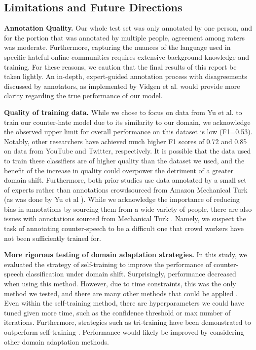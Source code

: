\documentclass[10pt,twocolumn,letterpaper]{article}
\begin{document}
\subsection*{Limitations and Future Directions}

\textbf{Annotation Quality.} Our whole test set was only annotated by one person, and for the portion that was annotated by multiple people, agreement among raters was moderate. Furthermore, capturing the nuances of the language used in specific hateful online communities requires extensive background knowledge and training. For these reasons, we caution that the final results of this report be taken lightly. An in-depth, expert-guided annotation process with disagreements discussed by annotators, as implemented by Vidgen et al. \cite{vidgen-etal-2021-introducing} would provide more clarity regarding the true performance of our model.

\textbf{Quality of training data.} While we chose to focus on data from Yu et al. \cite{yu-etal-2022-hate} to train our counter-hate model due to its similarity to our domain, we acknowledge the observed upper limit for overall performance on this dataset is low (F1=0.53). Notably, other researchers have achieved much higher F1 scores of 0.72 \cite{mathew2019thou} and 0.85 \cite{he2021racism} on data from YouTube and Twitter, respectively. It is possible that the data used to train these classifiers are of higher quality than the dataset we used, and the benefit of the increase in quality could overpower the detriment of a greater domain shift. Furthermore, both prior studies use data annotated by a small set of experts rather than annotations crowdsourced from Amazon Mechanical Turk (as was done by Yu et al \cite{yu-etal-2022-hate}). While we acknowledge the importance of reducing bias in annotations by sourcing them from a wide variety of people, there are also issues with annotations sourced from Mechanical Turk \cite{fort2011amazon}. Namely, we suspect the task of annotating counter-speech to be a difficult one that crowd workers have not been sufficiently trained for.

\textbf{More rigorous testing of domain adaptation strategies.} In this study, we evaluated the strategy of self-training to improve the performance of counter-speech classification under domain shift. Surprisingly, performance decreased when using this method. However, due to time constraints, this was the only method we tested, and there are many other methods that could be applied \cite{ramponi2020neural}. Even within the self-training method, there are hyperparameters we could have tuned given more time, such as the confidence threshold or max number of iterations. Furthermore, strategies such as tri-training have been demonstrated to outperform self-training \cite{ruder2018strong}. Performance would likely be improved by considering other domain adaptation methods.
\end{document}
